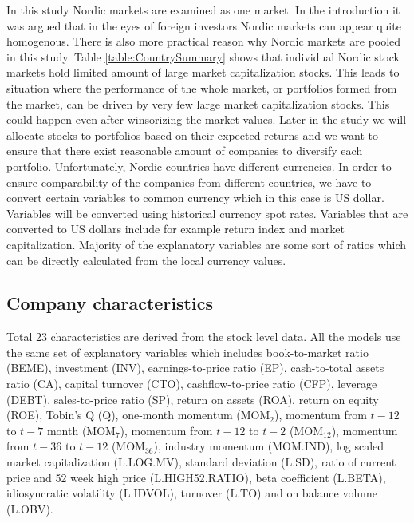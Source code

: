 \documentclass{article}
\begin{document}
In this study Nordic markets are examined as one market. In the introduction it was argued that in the eyes of foreign investors Nordic markets can appear quite homogenous. There is also more practical reason why Nordic markets are pooled in this study. Table \ref{table:CountrySummary} shows that individual Nordic stock markets hold limited amount of large market capitalization stocks. This leads to situation where the performance of the whole market, or portfolios formed from the market, can be driven by very few large market capitalization stocks. This could happen even after winsorizing the market values. Later in the study we will allocate stocks to portfolios based on their expected returns and we want to ensure that there exist reasonable amount of companies to diversify each portfolio. Unfortunately, Nordic countries have different currencies. In order to ensure comparability of the companies from different countries, we have to convert certain variables to common currency which in this case is US dollar. Variables will be converted using historical currency spot rates. Variables that are converted to US dollars include for example return index and market capitalization. Majority of the explanatory variables are some sort of ratios which can be directly calculated from the local currency values. \par

\subsection{Company characteristics}\label{CompanyCharacteristics}

Total 23 characteristics are derived from the stock level data. All the models use the same set of explanatory variables which includes book-to-market ratio (BEME), investment (INV), earnings-to-price ratio (EP), cash-to-total assets ratio (CA), capital turnover (CTO), cashflow-to-price ratio (CFP), leverage (DEBT), sales-to-price ratio (SP), return on assets (ROA), return on equity (ROE), Tobin's Q (Q), one-month momentum (MOM$_2$), momentum from $t-12$ to $t-7$ month (MOM$_7$), momentum from $t-12$ to $t-2$ (MOM$_{12}$), momentum from $t-36$ to $t-12$ (MOM$_{36}$), industry momentum (MOM.IND), log scaled market capitalization (L.LOG.MV), standard deviation (L.SD), ratio of current price and 52 week high price (L.HIGH52.RATIO), beta coefficient (L.BETA), idiosyncratic volatility (L.IDVOL), turnover (L.TO) and on balance volume (L.OBV). \par
\end{document}
